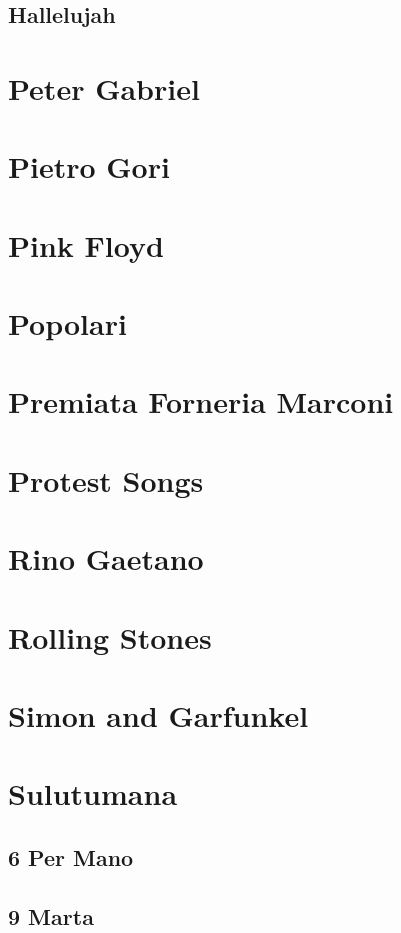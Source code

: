 \section{Hallelujah}

\chapter{Peter Gabriel}

\chapter{Pietro Gori}

\chapter{Pink Floyd}

\chapter{Popolari}

\chapter{Premiata Forneria Marconi}

\chapter{Protest Songs}

\chapter{Rino Gaetano}

\chapter{Rolling Stones}

\chapter{Simon and Garfunkel}

\chapter{Sulutumana}
\section{6 Per Mano}
\section{9 Marta}

